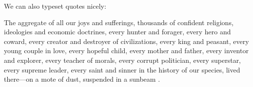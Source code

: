 We can also typeset quotes nicely:

\begin{displayquote}
The aggregate of all our joys and sufferings, thousands of confident religions, ideologies and economic doctrines, every hunter and forager, every hero and coward, every creator and destroyer of civilizations, every king and peasant, every young couple in love, every hopeful child, every mother and father, every inventor and explorer, every teacher of morals, every corrupt politician, every superstar, every supreme leader, every saint and sinner in the history of our species, lived there---on a mote of dust, suspended in a sunbeam \citep[][S. 6--7; see Figure \ref{samplefig}]{Sagan1994}.
\end{displayquote}






